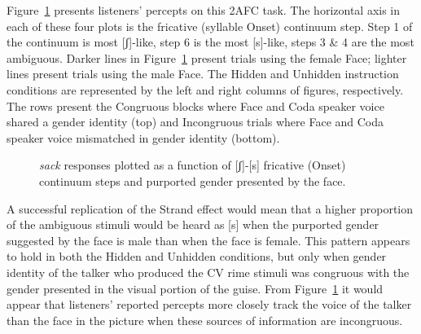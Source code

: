 \documentclass[
  letterpaper,
  DIV=11,
  numbers=noendperiod]{scrartcl}
\begin{document}
Figure~\ref{fig-scurve} presents listeners' percepts on this 2AFC task.
The horizontal axis in each of these four plots is the fricative
(syllable Onset) continuum step. Step 1 of the continuum is most
{[}ʃ{]}-like, step 6 is the most {[}s{]}-like, steps 3 \& 4 are the most
ambiguous. Darker lines in Figure~\ref{fig-scurve} present trials using
the female Face; lighter lines present trials using the male Face. The
Hidden and Unhidden instruction conditions are represented by the left
and right columns of figures, respectively. The rows present the
Congruous blocks where Face and Coda speaker voice shared a gender
identity (top) and Incongruous trials where Face and Coda speaker voice
mismatched in gender identity (bottom).

\begin{figure}


\caption{\label{fig-scurve}\emph{sack} responses plotted as a function
of {[}ʃ{]}-{[}s{]} fricative (Onset) continuum steps and purported
gender presented by the face.}

\end{figure}%

A successful replication of the Strand effect would mean that a higher
proportion of the ambiguous stimuli would be heard as {[}s{]} when the
purported gender suggested by the face is male than when the face is
female. This pattern appears to hold in both the Hidden and Unhidden
conditions, but only when gender identity of the talker who produced the
CV rime stimuli was congruous with the gender presented in the visual
portion of the guise. From Figure~\ref{fig-scurve} it would appear that
listeners' reported percepts more closely track the voice of the talker
than the face in the picture when these sources of information are
incongruous.
\end{document}

